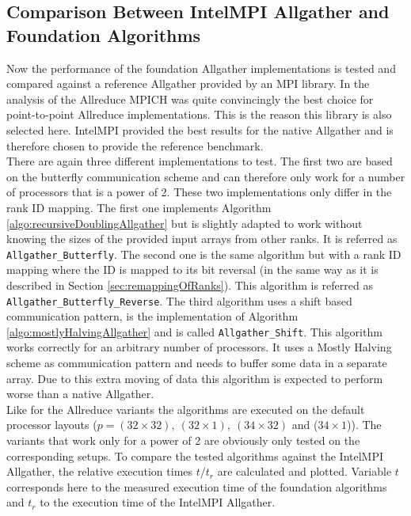 \subsection{Comparison Between IntelMPI Allgather and Foundation Algorithms}
Now the performance of the foundation Allgather implementations is tested and compared against a reference Allgather provided by an MPI library. In the analysis of the Allreduce MPICH was quite convincingly the best choice for point-to-point Allreduce implementations. This is the reason this library is also selected here. IntelMPI provided the best results for the native Allgather and is therefore chosen to provide the reference benchmark. \\
There are again three different implementations to test. The first two are based on the butterfly communication scheme and can therefore only work for a number of processors that is a power of 2. These two implementations only differ in the rank ID mapping. The first one implements Algorithm  \ref{algo:recursiveDoublingAllgather} but is slightly adapted to work without knowing the sizes of the provided input arrays from other ranks. It is referred as \texttt{All\-gath\-er\_But\-ter\-fly}. The second one is the same algorithm but with a rank ID mapping where the ID is mapped to its bit reversal (in the same way as it is described in Section \ref{sec:remappingOfRanks}). This algorithm is referred as \texttt{All\-gath\-er\_But\-ter\-fly\_Reverse}. The third algorithm uses a shift based communication pattern, is the implementation of Algorithm \ref{algo:mostlyHalvingAllgather} and is called \texttt{All\-gath\-er\-\_\-Shift}. This algorithm works correctly for an arbitrary number of processors. It uses a Mostly Halving scheme as communication pattern and needs to buffer some data in a separate array. Due to this extra moving of data this algorithm is expected to perform worse than a native Allgather.\\
Like for the Allreduce variants the algorithms are executed on the default processor layouts ($p=(32\times32),~(32\times1),~(34\times32)$ and ($34\times1$)). The variants that work only for a power of 2 are obviously only tested on the corresponding setups. To compare the tested algorithms against the IntelMPI Allgather, the relative execution times $t/t_r$ are calculated and plotted. Variable $t$ corresponds here to the measured execution time of the foundation algorithms and $t_r$ to the execution time of the IntelMPI Allgather. 

